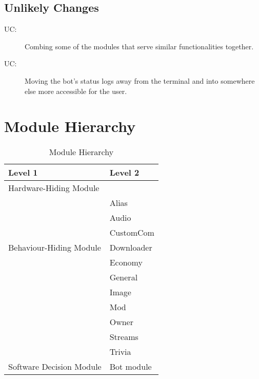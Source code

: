 \documentclass[12pt, titlepage]{article}
\newcounter{ucnum}
\newcommand{\uctheucnum}{UC\theucnum}
\begin{document}
\subsection{Unlikely Changes} \label{SecUchange}

\begin{description}
\item[ \uctheucnum \label{ucModules}:] Combing some of the modules that serve similar functionalities together.
\item[ \uctheucnum \label{ucOutput}:] Moving the bot's status logs away from the terminal and into somewhere else more accessible for the user.

\end{description}

\section{Module Hierarchy} \label{SecMH}

\begin{description}
\item 
\end{description}


\begin{table}[h!]
\centering
\begin{tabular}{p{} p{}}
\toprule
\textbf{Level 1} & \textbf{Level 2}\\
\midrule

{Hardware-Hiding Module} & ~ \\
\midrule

\multirow{7}{0.3\textwidth}{Behaviour-Hiding Module} & Alias\\
& Audio\\
& CustomCom\\
& Downloader\\
& Economy\\
& General\\
& Image\\ 
& Mod\\
& Owner\\
& Streams\\
& Trivia\\
\midrule

\multirow{1}{0.3\textwidth}{Software Decision Module} & {Bot module}\\
\bottomrule

\end{tabular}
\caption{Module Hierarchy}
\label{TblMH}
\end{table}
\end{document}
